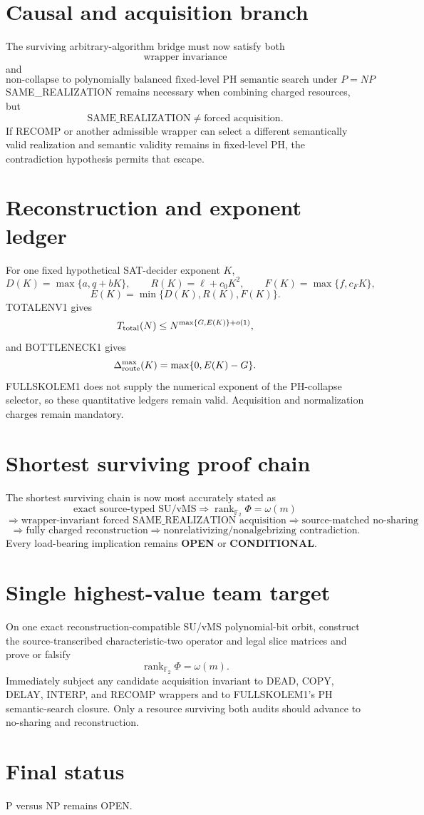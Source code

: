\documentclass[11pt]{article}
\begin{document}
\section*{Causal and acquisition branch}
The surviving arbitrary-algorithm bridge must now satisfy both
\[
\boxed{\text{wrapper invariance}}
\]
and
\[
\boxed{\text{non-collapse to polynomially balanced fixed-level PH semantic search under }P=NP}.
\]
SAME\_REALIZATION remains necessary when combining charged resources, but
\[
\text{SAME\_REALIZATION}\neq\text{forced acquisition}.
\]
If RECOMP or another admissible wrapper can select a different semantically valid realization and semantic validity remains in fixed-level PH, the contradiction hypothesis permits that escape.

\section*{Reconstruction and exponent ledger}
For one fixed hypothetical SAT-decider exponent \(K\),
\[
D(K)=\max\{a,q+bK\},\qquad
R(K)=\ell+c_0K^2,\qquad
F(K)=\max\{f,c_FK\},
\]
\[
E(K)=\min\{D(K),R(K),F(K)\}.
\]
TOTALENV1 gives
\[
T_{\rm total}(N)\le N^{\max\{G,E(K)\}+o(1)},
\]
and BOTTLENECK1 gives
\[
\Delta_{\rm route}^{\max}(K)=\max\{0,E(K)-G\}.
\]
FULLSKOLEM1 does not supply the numerical exponent of the PH-collapse selector, so these quantitative ledgers remain valid. Acquisition and normalization charges remain mandatory.

\section*{Shortest surviving proof chain}
The shortest surviving chain is now most accurately stated as
\[
\text{exact source-typed SU/vMS}
\Longrightarrow
\operatorname{rank}_{\mathbb F_2}\Phi=\omega(m)
\]
\[
\Longrightarrow
\boxed{\text{wrapper-invariant forced SAME\_REALIZATION acquisition}}
\Longrightarrow
\text{source-matched no-sharing}
\]
\[
\Longrightarrow
\text{fully charged reconstruction}
\Longrightarrow
\text{nonrelativizing/nonalgebrizing contradiction}.
\]
Every load-bearing implication remains \textbf{OPEN} or \textbf{CONDITIONAL}.

\section*{Single highest-value team target}
On one exact reconstruction-compatible SU/vMS polynomial-bit orbit, construct the source-transcribed characteristic-two operator and legal slice matrices and prove or falsify
\[
\boxed{\operatorname{rank}_{\mathbb F_2}\Phi=\omega(m)}.
\]
Immediately subject any candidate acquisition invariant to DEAD, COPY, DELAY, INTERP, and RECOMP wrappers and to FULLSKOLEM1's PH semantic-search closure. Only a resource surviving both audits should advance to no-sharing and reconstruction.

\section*{Final status}
P versus NP remains OPEN.

\end{document}
